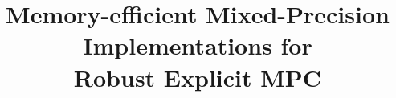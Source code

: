 \documentclass[sigconf,review,anonymous,dvipsnames]{acmart}
\begin{document}
%
\title{Memory-efficient Mixed-Precision Implementations for\\Robust Explicit MPC}

%





%

\renewcommand{\shortauthors}{}

%
\begin{abstract}

\end{abstract}
\end{document}
